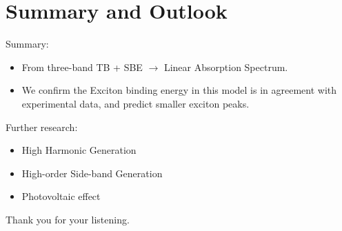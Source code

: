 \documentclass{beamer}
\begin{document}
\section{Summary and Outlook}
\begin{frame}
	\begin{block}{Summary:}
		\begin{itemize}
			\item From three-band TB + SBE $\to $ Linear Absorption Spectrum.\\
			\item We confirm the Exciton binding energy in this model is in agreement with experimental data, and predict smaller exciton peaks.
		\end{itemize}
	\end{block}
	\begin{exampleblock}{Further research:}
		\begin{itemize}
			\item High Harmonic Generation
			\item High-order Side-band Generation
			\item Photovoltaic effect
		\end{itemize}
	\end{exampleblock}
	\begin{center}
		Thank you for your listening.
	\end{center}
\end{frame}
\begin{frame}
\printbibliography
\end{frame}
\end{document}

